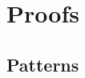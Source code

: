 \section{Proofs}


\subsection{Patterns}

\newcommand{\Cphi}{{\color{epfl-rouge}\phi}}
\newcommand{\Ca}{{\color{epfl-rouge!70}{?a}}}
\newcommand{\Cpsi}{{\color{epfl-leman}\psi}}
\newcommand{\Cb}{{\color{epfl-leman!70}{?b}}}
\newcommand{\Cx}{{\color{epfl-canard}x}}
\newcommand{\Cp}{{\color{epfl-rouge!70}{?p}}}
\newcommand{\Ct}{{\color{gray}{?t}}}


